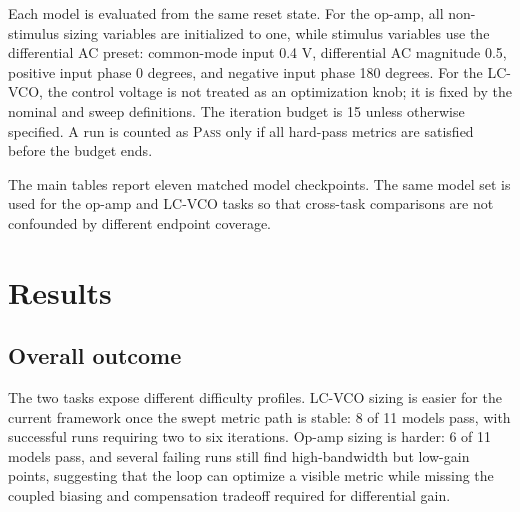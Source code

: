 \documentclass[acmsmall,review,anonymous]{acmart}
\newcommand{\pass}{\textsc{Pass}}
\begin{document}
Each model is evaluated from the same reset state. For the op-amp, all
non-stimulus sizing variables are initialized to one, while stimulus variables
use the differential AC preset: common-mode input 0.4 V, differential AC
magnitude 0.5, positive input phase 0 degrees, and negative input phase
180 degrees. For the LC-VCO, the control voltage is not treated as an
optimization knob; it is fixed by the nominal and sweep definitions. The
iteration budget is 15 unless otherwise specified. A run is counted as
\pass{} only if all hard-pass metrics are satisfied before the budget ends.

The main tables report eleven matched model checkpoints. The same model set is
used for the op-amp and LC-VCO tasks so that cross-task comparisons are not
confounded by different endpoint coverage.

\section{Results}
\label{sec:results}

\subsection{Overall outcome}

The two tasks expose different difficulty profiles. LC-VCO sizing is easier
for the current framework once the swept metric path is stable: 8 of 11 models
pass, with successful runs requiring two to six iterations. Op-amp sizing is
harder: 6 of 11 models pass, and several failing runs still find high-bandwidth
but low-gain points, suggesting that the loop can optimize a visible metric
while missing the coupled biasing and compensation tradeoff required for
differential gain.
\end{document}
